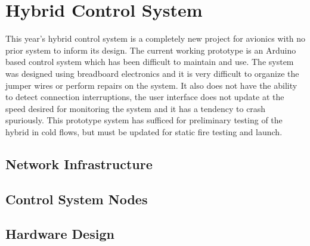 \section{Hybrid Control System}

This year's hybrid control system is a completely new project for avionics with no prior system to inform its design.
The current working prototype is an Arduino based control system which has been difficult to maintain and use. The
system was designed using breadboard electronics and it is very difficult to organize the jumper wires or perform
repairs on the system. It also does not have the ability to detect connection interruptions, the user interface does not
update at the speed desired for monitoring the system and it has a tendency to crash spuriously. This prototype system
has sufficed for preliminary testing of the hybrid in cold flows, but must be updated for static fire testing and
launch.

\subsection{Network Infrastructure}

\subsection{Control System Nodes}

\subsection{Hardware Design}
